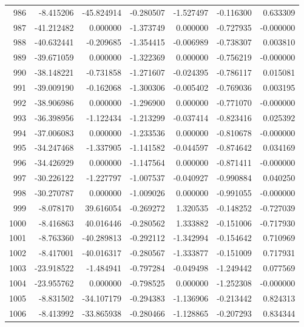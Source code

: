 \begin{tabular}{rrrrrrr}
 986 &  -8.415206 &  -45.824914 & -0.280507 &   -1.527497 &   -0.116300 &  0.633309 \\
 987 & -41.212482 &    0.000000 & -1.373749 &    0.000000 &   -0.727935 & -0.000000 \\
 988 & -40.632441 &   -0.209685 & -1.354415 &   -0.006989 &   -0.738307 &  0.003810 \\
 989 & -39.671059 &    0.000000 & -1.322369 &    0.000000 &   -0.756219 & -0.000000 \\
 990 & -38.148221 &   -0.731858 & -1.271607 &   -0.024395 &   -0.786117 &  0.015081 \\
 991 & -39.009190 &   -0.162068 & -1.300306 &   -0.005402 &   -0.769036 &  0.003195 \\
 992 & -38.906986 &    0.000000 & -1.296900 &    0.000000 &   -0.771070 & -0.000000 \\
 993 & -36.398956 &   -1.122434 & -1.213299 &   -0.037414 &   -0.823416 &  0.025392 \\
 994 & -37.006083 &    0.000000 & -1.233536 &    0.000000 &   -0.810678 & -0.000000 \\
 995 & -34.247468 &   -1.337905 & -1.141582 &   -0.044597 &   -0.874642 &  0.034169 \\
 996 & -34.426929 &    0.000000 & -1.147564 &    0.000000 &   -0.871411 & -0.000000 \\
 997 & -30.226122 &   -1.227797 & -1.007537 &   -0.040927 &   -0.990884 &  0.040250 \\
 998 & -30.270787 &    0.000000 & -1.009026 &    0.000000 &   -0.991055 & -0.000000 \\
 999 &  -8.078170 &   39.616054 & -0.269272 &    1.320535 &   -0.148252 & -0.727039 \\
1000 &  -8.416863 &   40.016446 & -0.280562 &    1.333882 &   -0.151006 & -0.717930 \\
1001 &  -8.763360 &  -40.289813 & -0.292112 &   -1.342994 &   -0.154642 &  0.710969 \\
1002 &  -8.417001 &  -40.016317 & -0.280567 &   -1.333877 &   -0.151009 &  0.717931 \\
1003 & -23.918522 &   -1.484941 & -0.797284 &   -0.049498 &   -1.249442 &  0.077569 \\
1004 & -23.955762 &    0.000000 & -0.798525 &    0.000000 &   -1.252308 & -0.000000 \\
1005 &  -8.831502 &  -34.107179 & -0.294383 &   -1.136906 &   -0.213442 &  0.824313 \\
1006 &  -8.413992 &  -33.865938 & -0.280466 &   -1.128865 &   -0.207293 &  0.834344 \\

\end{tabular}

